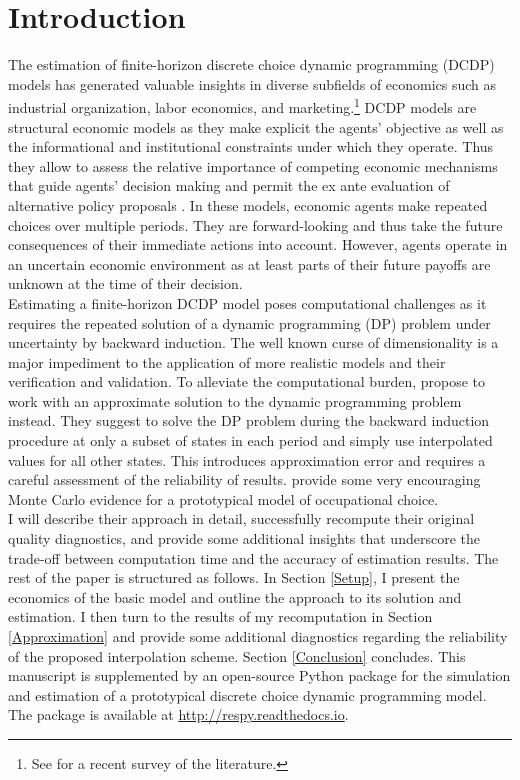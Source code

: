 \section{Introduction}
The estimation of finite-horizon discrete choice dynamic programming (DCDP) models has generated valuable insights in diverse subfields of economics such as industrial organization, labor economics, and marketing.\footnote{See \citet{Keane.2011d} for a recent survey of the literature.} DCDP models are structural economic models as they make explicit the agents' objective as well as the informational and institutional constraints under which they operate. Thus they allow to assess the relative importance of competing economic mechanisms that guide agents' decision making and permit the ex ante evaluation of alternative policy proposals \citep{Wolpin.2013}. In these models, economic agents make repeated choices over multiple periods. They are forward-looking and thus take the future consequences of their immediate actions into account. However, agents operate in an uncertain economic environment as at least parts of their future payoffs are unknown at the time of their decision.\\\newline
%
Estimating a finite-horizon DCDP model poses computational challenges as it requires the repeated solution of a dynamic programming (DP) problem under uncertainty by backward induction. The well known curse of dimensionality \citep{Bellman.1957} is a major impediment to the application of more realistic models and their verification and validation. To alleviate the computational burden, \citet{Keane.1994} propose to work with an approximate solution to the dynamic programming problem instead. They suggest to solve the DP problem during the backward induction procedure at only a subset of states in each period and simply use interpolated values for all other states. This introduces approximation error and requires a careful assessment of the reliability of results. \citet{Keane.1994} provide some very encouraging Monte Carlo evidence for a prototypical model of occupational choice.\\\newline
%
I will describe their approach in detail, successfully recompute their original quality diagnostics, and provide some additional insights that underscore the trade-off between computation time and the accuracy of estimation results. The rest of the paper is structured as follows. In Section \ref{Setup}, I present the economics of the basic model and outline the approach to its solution and estimation. I then turn to the results of my recomputation in Section \ref{Approximation} and provide some additional diagnostics regarding the reliability of the proposed interpolation scheme. Section \ref{Conclusion} concludes. This manuscript is supplemented by an open-source Python package for the simulation and estimation of a prototypical discrete choice dynamic programming model. The package is available at \url{http://respy.readthedocs.io}.

